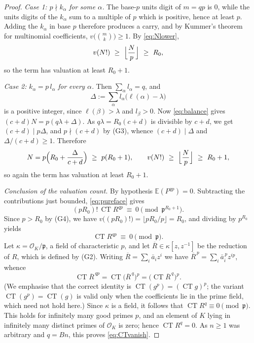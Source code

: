 \documentclass[11pt]{amsart}
\theoremstyle{plain}
\theoremstyle{remark}
\numberwithin{equation}{section}
\DeclareMathOperator{\CT}{CT}
\newcommand{\E}{\mathbb{E}}
\begin{document}
\begin{proof}
\emph{Case 1: $p\nmid k_\alpha$ for some $\alpha$.} The base-$p$ units digit of
$m=qp$ is $0$, while the units digits of the $k_\alpha$ sum to a multiple of
$p$ which is positive, hence at least $p$. Adding the $k_\alpha$ in base $p$
therefore produces a carry, and by Kummer's theorem for multinomial
coefficients, $v\bigl(\binom{m}{k}\bigr)\ge1$. By \eqref{eq:Nlower},
\[
  v(N!)\ \ge\ \Bigl\lfloor\frac{N}{p}\Bigr\rfloor\ \ge\ R_0 ,
\]
so the term has valuation at least $R_0+1$.

\emph{Case 2: $k_\alpha=p\,l_\alpha$ for every $\alpha$.} Then
$\sum_\alpha l_\alpha=q$, and
\[
  \Delta:=\sum_\alpha l_\alpha\bigl(\ell(\alpha)-\lambda\bigr)
\]
is a positive integer, since $\ell(\beta)>\lambda$ and $l_\beta>0$. Now
\eqref{eq:balance} gives $(c+d)N=p(q\lambda+\Delta)$. As $q\lambda=R_0(c+d)$ is
divisible by $c+d$, we get $(c+d)\mid p\Delta$, and $p\nmid(c+d)$ by (G3),
whence $(c+d)\mid\Delta$ and $\Delta/(c+d)\ge1$. Therefore
\[
  N=p\Bigl(R_0+\frac{\Delta}{c+d}\Bigr)\ \ge\ p(R_0+1),
  \qquad
  v(N!)\ \ge\ \Bigl\lfloor\frac{N}{p}\Bigr\rfloor\ \ge\ R_0+1 ,
\]
so again the term has valuation at least $R_0+1$.

\smallskip
\noindent\emph{Conclusion of the valuation count.} By hypothesis
$\E(P^{qp})=0$. Subtracting the contributions just bounded, \eqref{eq:pureface}
gives
\[
  (pR_0)!\,\CT R^{qp}\ \equiv\ 0 \pmod{\mathfrak p^{R_0+1}} .
\]
Since $p>R_0$ by (G4), we have
$v\bigl((pR_0)!\bigr)=\lfloor pR_0/p\rfloor=R_0$, and dividing by $p^{R_0}$
yields
\[
  \CT R^{qp}\ \equiv\ 0 \pmod{\mathfrak p} .
\]
Let $\kappa=\mathcal O_K/\mathfrak p$, a field of characteristic $p$, and let
$\overline R\in\kappa[z,z^{-1}]$ be the reduction of $R$, which is defined by
(G2). Writing $\overline R=\sum_i \bar a_iz^i$ we have
$\overline R^{\,p}=\sum_i\bar a_i^{\,p}z^{ip}$, whence
\[
  \CT \overline R^{\,qp}
  =\CT\bigl(\overline R^{\,q}\bigr)^{p}
  =\bigl(\CT \overline R^{\,q}\bigr)^{p} .
\]
(We emphasise that the correct identity is $\CT(g^p)=(\CT g)^p$; the variant
$\CT(g^p)=\CT(g)$ is valid only when the coefficients lie in the prime field,
which need not hold here.) Since $\kappa$ is a field, it follows that
$\CT R^{q}\equiv0\pmod{\mathfrak p}$. This holds for infinitely many good
primes $p$, and an element of $K$ lying in infinitely many distinct primes of
$\mathcal O_K$ is zero; hence $\CT R^{q}=0$. As $n\ge1$ was arbitrary and
$q=Bn$, this proves \eqref{eq:CTvanish}.


\end{proof}
\end{document}
